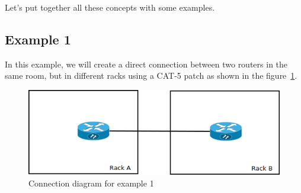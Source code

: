 \documentclass[a4paper]{article}
\begin{document}
		Let's put together all these concepts with some examples. 
		\subsection{Example 1} \label{sec:physical_connections_example_1}
			In this example, we will create a direct connection between two routers in the same room, but in different racks using a CAT-5 patch as shown in the figure~\ref{fig:l1_example_1}.\newline
			\begin{figure}[h!]
				\centering
				\includegraphics[width=0.5\linewidth]{img/l1_example_1.png}
				\caption{Connection diagram for example 1}
				\label{fig:l1_example_1}
			\end{figure}
			
\end{document}
